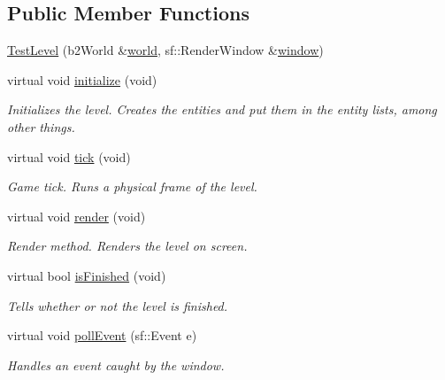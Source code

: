 \subsection*{Public Member Functions}
\begin{DoxyCompactItemize}
\item 
\hyperlink{class_test_level_a5f5e91dab534ad6e17ca716f11c7274a}{Test\+Level} (b2\+World \&\hyperlink{class_abstract_level_a566499434bbd056afd9e12b971e8a41e}{world}, sf\+::\+Render\+Window \&\hyperlink{class_abstract_level_a3332e1be17da924be26064ac4e089721}{window})
\item 
virtual void \hyperlink{class_test_level_a4be8aacf1a305c58b7670de20d6f4303}{initialize} (void)
\begin{DoxyCompactList}\small\item\em Initializes the level. Creates the entities and put them in the entity lists, among other things. \end{DoxyCompactList}\item 
virtual void \hyperlink{class_test_level_a299cc2d19d10678e932bf2df65fe9902}{tick} (void)
\begin{DoxyCompactList}\small\item\em Game tick. Runs a physical frame of the level. \end{DoxyCompactList}\item 
virtual void \hyperlink{class_test_level_a840787cff2a1941a5ce4fafe31433094}{render} (void)
\begin{DoxyCompactList}\small\item\em Render method. Renders the level on screen. \end{DoxyCompactList}\item 
virtual bool \hyperlink{class_test_level_a2644a0797dc2224ff9088a4c87e71b2b}{is\+Finished} (void)
\begin{DoxyCompactList}\small\item\em Tells whether or not the level is finished. \end{DoxyCompactList}\item 
virtual void \hyperlink{class_test_level_a4f16d4600d4b2aeb9299af3417977539}{poll\+Event} (sf\+::\+Event e)
\begin{DoxyCompactList}\small\item\em Handles an event caught by the window. \end{DoxyCompactList}\end{DoxyCompactItemize}
